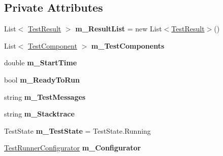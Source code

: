 \subsection*{Private Attributes}
\begin{DoxyCompactItemize}
\item 
\mbox{\label{class_unity_test_1_1_test_runner_af513fdba2cdf4a5235e449c140cc7dbd}} 
List$<$ \hyperlink{class_unity_test_1_1_test_result}{Test\+Result} $>$ {\bfseries m\+\_\+\+Result\+List} = new List$<$\hyperlink{class_unity_test_1_1_test_result}{Test\+Result}$>$()
\item 
\mbox{\label{class_unity_test_1_1_test_runner_a0684a62338ff8d48a8bf842d3087a88a}} 
List$<$ \hyperlink{class_unity_test_1_1_test_component}{Test\+Component} $>$ {\bfseries m\+\_\+\+Test\+Components}
\item 
\mbox{\label{class_unity_test_1_1_test_runner_a12eb580e1e1eceba2c8e3f540e106eed}} 
double {\bfseries m\+\_\+\+Start\+Time}
\item 
\mbox{\label{class_unity_test_1_1_test_runner_aeca129db8e54695033c238ea9d7861fa}} 
bool {\bfseries m\+\_\+\+Ready\+To\+Run}
\item 
\mbox{\label{class_unity_test_1_1_test_runner_a7160811a417953229059810aeb042d55}} 
string {\bfseries m\+\_\+\+Test\+Messages}
\item 
\mbox{\label{class_unity_test_1_1_test_runner_a35ea6527f0d5ead14f85bc27fe037d21}} 
string {\bfseries m\+\_\+\+Stacktrace}
\item 
\mbox{\label{class_unity_test_1_1_test_runner_a81e98e180129d6010e2ad6d229d4b36e}} 
Test\+State {\bfseries m\+\_\+\+Test\+State} = Test\+State.\+Running
\item 
\mbox{\label{class_unity_test_1_1_test_runner_afd348544131633bd952752eba89d752d}} 
\hyperlink{class_unity_test_1_1_test_runner_configurator}{Test\+Runner\+Configurator} {\bfseries m\+\_\+\+Configurator}
\item 

\end{DoxyCompactItemize}
